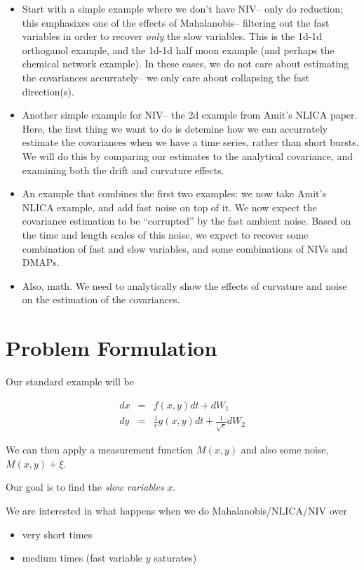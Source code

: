\documentclass[12pt]{article}
\begin{document}
\begin{itemize}

\item Start with a simple example where we don't have NIV-- only do reduction; this emphasixes one of the effects of Mahalanobis-- filtering out the fast variables in order to recover {\em only} the slow variables. This is the 1d-1d orthoganol example, and the 1d-1d half moon example (and perhaps the chemical network example). In these cases, we do not care about estimating the covariances accurrately-- we only care about collapsing the fast direction(s). 
\item Another simple example for NIV-- the 2d example from Amit's NLICA paper. Here, the first thing we want to do is detemine how we can accurrately estimate the covariances when we have a time series, rather than short bursts. We will do this by comparing our estimates to the analytical covariance, and examining both the drift and curvature effects. 
\item An example that combines the first two examples: we now take Amit's NLICA example, and add fast noise on top of it. We now expect the covariance estimation to be ``corrupted'' by the fast ambient noise. Based on the time and length scales of this noise, we expect to recover some combination of fast and slow variables, and some combinations of NIVs and DMAPs.
\item Also, math. We need to analytically show the effects of curvature and noise on the estimation of the covariances. 
\end{itemize}

\section{Problem Formulation}

Our standard example will be

\begin{eqnarray}
dx & = & f(x, y) dt + dW_1 \\
dy & = & \frac{1}{\epsilon} g(x, y) dt + \frac{1}{\sqrt{\epsilon}} dW_2
\end{eqnarray}

We can then apply a measurement function $M(x, y)$ and also some noise, $M(x, y) + \xi$.

Our goal is to find the {\em slow variables} $x$.

We are interested in what happens when we do Mahalanobis/NLICA/NIV over
\begin{itemize}
\item very short times
\item medium times (fast variable $y$ saturates)
\end{itemize}
\end{document}
